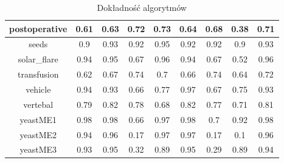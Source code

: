 \begin{table}[h]
\begin{center}
{\begin{tabular}{|c|c|c|c|c|c|c|c|c|}
				\hline%
				postoperative&0.61&0.63&0.72&0.73&0.64&0.68&0.38&0.71\\%
				\hline%
				seeds&0.9&0.93&0.92&0.95&0.92&0.92&0.9&0.93\\%
				\hline%
				solar\_flare&0.94&0.95&0.67&0.96&0.94&0.67&0.52&0.96\\%
				\hline%
				transfusion&0.62&0.67&0.74&0.7&0.66&0.74&0.64&0.72\\%
				\hline%
				vehicle&0.94&0.93&0.66&0.77&0.97&0.67&0.75&0.93\\%
				\hline%
				vertebal&0.79&0.82&0.78&0.68&0.82&0.77&0.71&0.81\\%
				\hline%
				yeastME1&0.98&0.98&0.66&0.97&0.98&0.7&0.92&0.98\\%
				\hline%
				yeastME2&0.94&0.96&0.17&0.97&0.97&0.17&0.1&0.96\\%
				\hline%
				yeastME3&0.93&0.95&0.32&0.89&0.95&0.29&0.89&0.94\\%
				\hline%
			\end{tabular}}%
			\caption{Dokładność algorytmów}
			\label{tab1}
		\end{center}
	\end{table}
	
